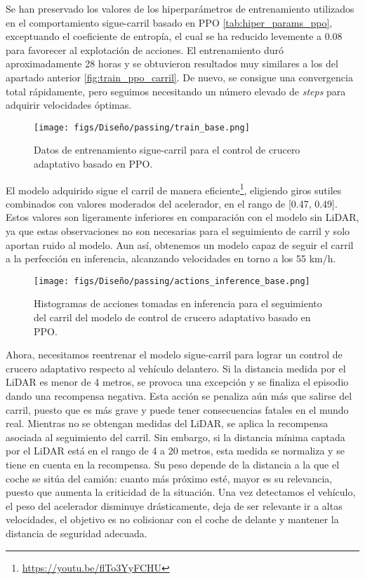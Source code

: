 \newpage

Se han preservado los valores de los hiperparámetros de entrenamiento utilizados en el comportamiento sigue-carril basado en \ac{PPO} \ref{tab:hiper_params_ppo}, exceptuando el coeficiente de entropía, el cual se ha reducido levemente a 0.08 para favorecer al explotación de acciones. El entrenamiento duró aproximadamente 28 horas y se obtuvieron resultados muy similares a los del apartado anterior \ref{fig:train_ppo_carril}. De nuevo, se consigue una convergencia total rápidamente, pero seguimos necesitando un número elevado de \textit{steps} para adquirir velocidades óptimas.

\begin{figure}[ht]
\centering
\texttt{[image: figs/Diseño/passing/train\_base.png]}
\caption{Datos de entrenamiento sigue-carril para el control de crucero adaptativo basado en \ac{PPO}.}
\label{fig:passing_train_base}
\end{figure}

El modelo adquirido sigue el carril de manera eficiente\footnote{\url{https://youtu.be/flTo3YyFCHU}}, eligiendo giros sutiles combinados con valores moderados del acelerador, en el rango de [0.47, 0.49]. Estos valores son ligeramente inferiores en comparación con el modelo sin \ac{LiDAR}, ya que estas observaciones no son necesarias para el seguimiento de carril y solo aportan ruido al modelo. Aun así, obtenemos un modelo capaz de seguir el carril a la perfección en inferencia, alcanzando velocidades en torno a los 55 km/h.
\begin{figure}[ht]
\centering
\texttt{[image: figs/Diseño/passing/actions\_inference\_base.png]}
\caption{Histogramas de acciones tomadas en inferencia para el seguimiento del carril del modelo de control de crucero adaptativo basado en \ac{PPO}.}
\label{fig:passing_inference_lane}
\end{figure}

\newpage

Ahora, necesitamos reentrenar el modelo sigue-carril para lograr un control de crucero adaptativo respecto al vehículo delantero. Si la distancia medida por el \ac{LiDAR} es menor de 4 metros, se provoca una excepción y se finaliza el episodio dando una recompensa negativa. Esta acción se penaliza aún más que salirse del carril, puesto que es más grave y puede tener consecuencias fatales en el mundo real. Mientras no se obtengan medidas del \ac{LiDAR}, se aplica la recompensa asociada al seguimiento del carril. Sin embargo, si la distancia mínima captada por el \ac{LiDAR} está en el rango de 4 a 20 metros, esta medida se normaliza y se tiene en cuenta en la recompensa. Su peso depende de la distancia a la que el coche se sitúa del camión: cuanto más próximo esté, mayor es su relevancia, puesto que aumenta la criticidad de la situación. Una vez detectamos el vehículo, el peso del acelerador disminuye drásticamente, deja de ser relevante ir a altas velocidades, el objetivo es no colisionar con el coche de delante y mantener la distancia de seguridad adecuada.

